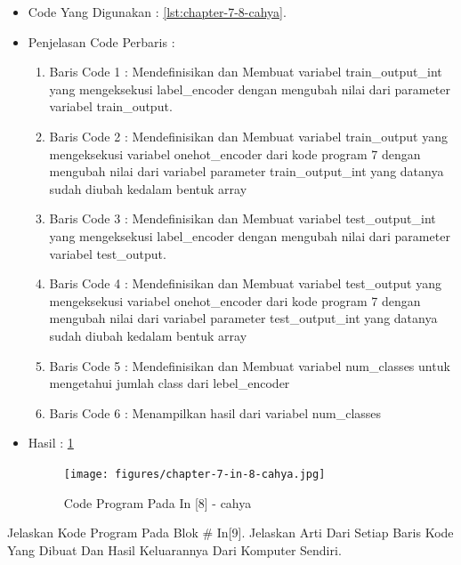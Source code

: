 \begin{itemize}
\item Code Yang Digunakan : \ref{lst:chapter-7-8-cahya}.

\par
\par
\item Penjelasan Code Perbaris	: 
\begin{enumerate}
\item Baris Code 1	: Mendefinisikan dan Membuat variabel train\_output\_int yang mengeksekusi label\_encoder dengan mengubah nilai dari parameter variabel train\_output.
\item Baris Code 2	: Mendefinisikan dan Membuat variabel train\_output yang mengeksekusi variabel onehot\_encoder dari kode program 7 dengan mengubah nilai dari variabel parameter train\_output\_int yang datanya sudah diubah kedalam bentuk array 
\item Baris Code 3	: Mendefinisikan dan Membuat variabel test\_output\_int yang mengeksekusi label\_encoder dengan mengubah nilai dari parameter variabel test\_output.
\item Baris Code 4	: Mendefinisikan dan Membuat variabel test\_output yang mengeksekusi variabel onehot\_encoder dari kode program 7 dengan mengubah nilai dari variabel parameter test\_output\_int yang datanya sudah diubah kedalam bentuk array 
\item Baris Code 5	: Mendefinisikan dan Membuat variabel num\_classes untuk mengetahui jumlah class dari lebel\_encoder
\item Baris Code 6	: Menampilkan hasil dari variabel num\_classes
\end{enumerate}
\item Hasil : \ref{chapter-7-in-8-cahya}
\par
\par
\begin{figure}[!hbtp]
\centering
\texttt{[image: figures/chapter-7-in-8-cahya.jpg]}
\caption{Code Program Pada In [8] - cahya}
\label{chapter-7-in-8-cahya}
\end{figure}
\par
\par
\end{itemize}
\par
\par
\par
\item Jelaskan Kode Program Pada Blok \# In[9]. Jelaskan Arti Dari Setiap Baris Kode Yang Dibuat Dan Hasil Keluarannya Dari Komputer Sendiri.
